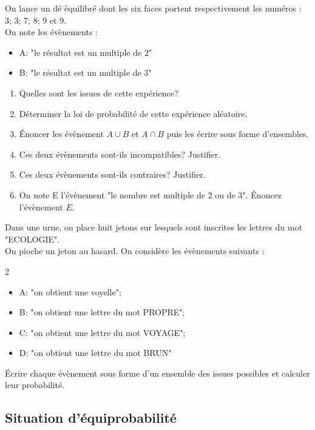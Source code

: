 {\begin{Exercice}
On lance un dé équilibré dont les six faces portent respectivement les numéros :
3; 3; 7; 8; 9 et 9.\\
On note les évènements :
\begin{itemize}[label=\textcolor{Couleur6}{$\bullet$}]
\item A:  "le résultat est un multiple de 2"
\item B:  "le résultat est un multiple de 3"
\end{itemize}
\begin{enumerate}
\item Quelles sont les issues de cette expérience?
\item Déterminer la loi de probabilité de cette expérience aléatoire.
\item Énoncer les évènement $ A \cup B $ et $ A\cap B $ puis les écrire sous forme d'ensembles.
\item Ces deux évènements sont-ils incompatibles? Justifier.
\item Ces deux évènements sont-ils contraires? Justifier.
\item On note E l'évènement  "le nombre est multiple de 2 ou de 3". Énoncez l'évènement $ \overline{E} $.
\end{enumerate}
\end{Exercice}

\begin{Exercice}
Dans une urne, on place huit jetons sur lesquels sont inscrites les lettres du mot  "ECOLOGIE".\\
On pioche un jeton au hasard. On considère les évènements suivants :
\vspace{-0.5cm}
\begin{multicols}{2}
\begin{itemize}[label=\textcolor{Couleur6}{$\bullet$}]
\item A:  "on obtient une voyelle";
\item B:  "on obtient une lettre du mot PROPRE";
\item C:  "on obtient une lettre du mot VOYAGE";
\item D:  "on obtient une lettre du mot BRUN"
\end{itemize}
\end{multicols}
Écrire chaque évènement sous forme d'un ensemble des issues possibles et calculer leur probabilité.
\end{Exercice}

\subsection*{Situation d'équiprobabilité}

}
